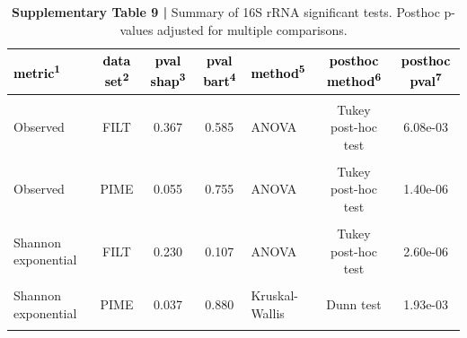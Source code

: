 \documentclass[
  10pt,
  letterpaper,
  DIV=11,
  numbers=noendperiod]{scrartcl}
\begin{document}
\begin{table}[H]

\caption{\textbf{Supplementary Table 9 |} Summary of 16S rRNA significant tests. Posthoc p-values adjusted for multiple comparisons.}
\centering
\fontsize{8}{10}\selectfont
\begin{threeparttable}
\begin{tabular}[t]{lccclcc}
\toprule
\textcolor{black}{\textbf{metric\textsuperscript{1}}} & \textcolor{black}{\textbf{data set\textsuperscript{2}}} & \textcolor{black}{\textbf{pval shap\textsuperscript{3}}} & \textcolor{black}{\textbf{pval bart\textsuperscript{4}}} & \textcolor{black}{\textbf{method\textsuperscript{5}}} & \textcolor{black}{\textbf{posthoc method\textsuperscript{6}}} & \textcolor{black}{\textbf{posthoc pval\textsuperscript{7}}}\\
\midrule
\cellcolor{gray!6}{Observed} & \cellcolor{gray!6}{FULL} & \cellcolor{gray!6}{0.268} & \cellcolor{gray!6}{0.599} & \cellcolor{gray!6}{ANOVA} & \cellcolor{gray!6}{Tukey post-hoc test} & \cellcolor{gray!6}{6.05e-02}\\
Observed & FILT & 0.367 & 0.585 & ANOVA & Tukey post-hoc test & 6.08e-03\\
\cellcolor{gray!6}{Observed} & \cellcolor{gray!6}{PERFect} & \cellcolor{gray!6}{0.191} & \cellcolor{gray!6}{0.437} & \cellcolor{gray!6}{ANOVA} & \cellcolor{gray!6}{Tukey post-hoc test} & \cellcolor{gray!6}{5.05e-02}\\
Observed & PIME & 0.055 & 0.755 & ANOVA & Tukey post-hoc test & 1.40e-06\\
\addlinespace
\cellcolor{gray!6}{Shannon exponential} & \cellcolor{gray!6}{FULL} & \cellcolor{gray!6}{0.994} & \cellcolor{gray!6}{0.490} & \cellcolor{gray!6}{ANOVA} & \cellcolor{gray!6}{Tukey post-hoc test} & \cellcolor{gray!6}{6.27e-05}\\
Shannon exponential & FILT & 0.230 & 0.107 & ANOVA & Tukey post-hoc test & 2.60e-06\\
\cellcolor{gray!6}{Shannon exponential} & \cellcolor{gray!6}{PERFect} & \cellcolor{gray!6}{0.331} & \cellcolor{gray!6}{0.159} & \cellcolor{gray!6}{ANOVA} & \cellcolor{gray!6}{Tukey post-hoc test} & \cellcolor{gray!6}{7.10e-06}\\
Shannon exponential & PIME & 0.037 & 0.880 & Kruskal-Wallis & Dunn test & 1.93e-03\\
\addlinespace
\cellcolor{gray!6}{Inverse Simpson} & \cellcolor{gray!6}{FULL} & \cellcolor{gray!6}{0.584} & \cellcolor{gray!6}{0.155} & \cellcolor{gray!6}{ANOVA} & \cellcolor{gray!6}{Tukey post-hoc test} & \cellcolor{gray!6}{4.67e-05}\\

\end{tabular}
\end{threeparttable}
\end{table}
\end{document}
